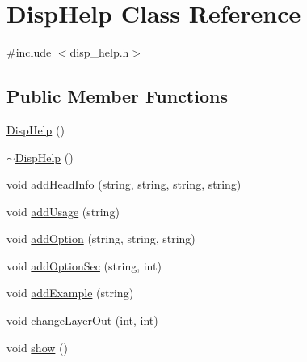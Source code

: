 \hypertarget{class_disp_help}{}\section{Disp\+Help Class Reference}
\label{class_disp_help}


{\ttfamily \#include $<$disp\+\_\+help.\+h$>$}

\subsection*{Public Member Functions}
\begin{DoxyCompactItemize}
\item 
\mbox{\hyperlink{class_disp_help_a2f0b69b1a355515cce11ccd7bdc56835}{Disp\+Help}} ()
\item 
\mbox{\hyperlink{class_disp_help_a2c04f5eec74db7450593e3455a56ffd5}{$\sim$\+Disp\+Help}} ()
\item 
void \mbox{\hyperlink{class_disp_help_ab174af43e0c86e6ee937b222fe4f371b}{add\+Head\+Info}} (string, string, string, string)
\item 
void \mbox{\hyperlink{class_disp_help_ab92ccbc848ad51f388ac6dfb8bc6e0ac}{add\+Usage}} (string)
\item 
void \mbox{\hyperlink{class_disp_help_abc0fb5858d688e9664880cfb130670a9}{add\+Option}} (string, string, string)
\item 
void \mbox{\hyperlink{class_disp_help_ad79dc98aa0e2c5cc4053a39edf0ecc6b}{add\+Option\+Sec}} (string, int)
\item 
void \mbox{\hyperlink{class_disp_help_ab483990fe64bdc07e485d84b96079d61}{add\+Example}} (string)
\item 
void \mbox{\hyperlink{class_disp_help_ad37e27be9fe71c39950b27e9dd282ce7}{change\+Layer\+Out}} (int, int)
\item 
void \mbox{\hyperlink{class_disp_help_a774d2c992ef7d5b2655f56e5ef853fa8}{show}} ()
\end{DoxyCompactItemize}
